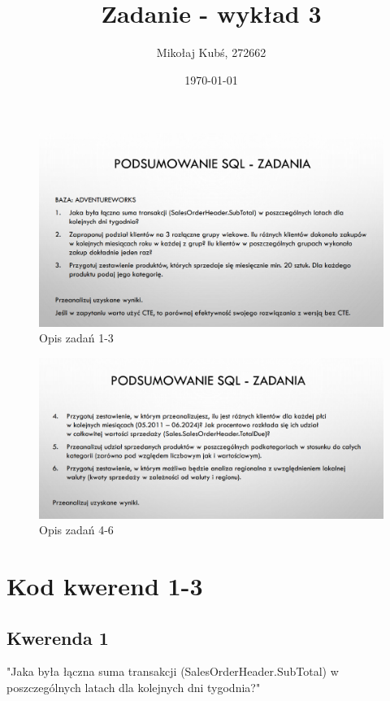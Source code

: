 \documentclass[a4paper,12pt]{article}
\title{Zadanie - wykład 3}
\author{Mikołaj Kubś, 272662}
\date{\today}
\begin{document}
\maketitle

\begin{figure}[H]
	\centering
	\includegraphics[width=1\textwidth]{images/task1.png}
	\caption{Opis zadań 1-3}
\end{figure}

\begin{figure}[H]
	\centering
	\includegraphics[width=1\textwidth]{images/task2.png}
	\caption{Opis zadań 4-6}
\end{figure}

\section{Kod kwerend 1-3}

\subsection{Kwerenda 1}

"Jaka była łączna suma transakcji (SalesOrderHeader.SubTotal) w poszczególnych latach dla kolejnych dni tygodnia?"
\end{document}
